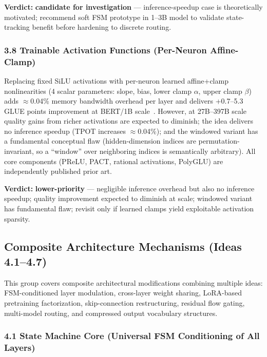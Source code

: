 \documentclass[11pt]{article}
\begin{document}
\textbf{Verdict:} \textbf{candidate for investigation} --- inference-speedup case is theoretically motivated; recommend soft FSM prototype in 1--3B model to validate state-tracking benefit before hardening to discrete routing.

\subsubsection{3.8 Trainable Activation Functions (Per-Neuron Affine-Clamp)}
\label{sec:idea_3_8}

Replacing fixed SiLU activations with per-neuron learned affine+clamp nonlinearities (4 scalar parameters: slope, bias, lower clamp $\alpha$, upper clamp $\beta$) adds $\approx$0.04\% memory bandwidth overhead per layer and delivers +0.7--5.3 GLUE points improvement at BERT/1B scale~\cite{Fang2023RAFT,Zhuo2025PolyNorm}.
However, at 27B--397B scale quality gains from richer activations are expected to diminish; the idea delivers no inference speedup (TPOT increases $\approx$0.04\%); and the windowed variant has a fundamental conceptual flaw (hidden-dimension indices are permutation-invariant, so a ``window'' over neighboring indices is semantically arbitrary).
All core components (PReLU, PACT, rational activations, PolyGLU) are independently published prior art.

\textbf{Verdict:} \textbf{lower-priority} --- negligible inference overhead but also no inference speedup; quality improvement expected to diminish at scale; windowed variant has fundamental flaw; revisit only if learned clamps yield exploitable activation sparsity.

\subsection{Composite Architecture Mechanisms (Ideas 4.1--4.7)}
\label{sec:group4}

This group covers composite architectural modifications combining multiple ideas: FSM-conditioned layer modulation, cross-layer weight sharing, LoRA-based pretraining factorization, skip-connection restructuring, residual flow gating, multi-model routing, and compressed output vocabulary structures.

\subsubsection{4.1 State Machine Core (Universal FSM Conditioning of All Layers)}
\label{sec:idea_4_1}
\end{document}
